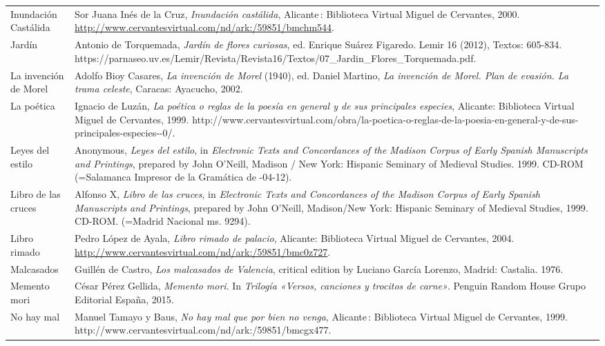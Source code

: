 \begin{tabularx}{\textwidth}{XX}
Inundación Castálida & Sor Juana Inés de la Cruz, \textit{Inundación castálida}, Alicante : Biblioteca Virtual Miguel de Cervantes, 2000. \url{http://www.cervantesvirtual.com/nd/ark:/59851/bmchm544}.\\
Jardín & Antonio de Torquemada, \textit{Jardín de flores curiosas}, ed. Enrique Suárez Figaredo. Lemir 16 (2012), Textos: 605-834. https://parnaseo.uv.es/Lemir/Revista/Revista16/Textos/07\_Jardin\_Flores\_Torquemada.pdf.\\
La invención de Morel & Adolfo Bioy Casares, \textit{La invención de Morel} (1940), ed. Daniel Martino, \textit{La invención de Morel. Plan de evasión. La trama celeste}, Caracas: Ayacucho, 2002.\\
La poética & Ignacio de Luzán, \textit{La poética o reglas de la poesía en general y de sus principales especies}, Alicante: Biblioteca Virtual Miguel de Cervantes, 1999. http://www.cervantesvirtual.com/obra/la-poetica-o-reglas-de-la-poesia-en-general-y-de-sus-principales-especies-{}-0/.\\
Leyes del estilo & Anonymous, \textit{Leyes del estilo}, in \textit{Electronic Texts and Concordances of the Madison Corpus of Early Spanish Manuscripts and Printings}, prepared by John O’Neill, Madison / New York: Hispanic Seminary of Medieval Studies. 1999. CD-ROM (=Salamanca Impresor de la Gramática de \citealt{Nebrija1500}-04-12).\\
Libro de las cruces & Alfonso X, \textit{Libro de las cruces}, in \textit{Electronic Texts and Concordances of the Madison Corpus of Early Spanish Manuscripts and Printings}, prepared by John O’Neill, Madison/New York: Hispanic Seminary of Medieval Studies, 1999. CD-ROM. (=Madrid Nacional ms. 9294).\\
Libro rimado & Pedro López de Ayala, \textit{Libro rimado de palacio}, Alicante: Biblioteca Virtual Miguel de Cervantes, 2004. \url{http://www.cervantesvirtual.com/nd/ark:/59851/bmc0z727}.\\
Malcasados & Guillén de Castro, \textit{Los malcasados de Valencia}, critical edition by Luciano García Lorenzo, Madrid: Castalia. 1976.\\
Memento mori & César Pérez Gellida, \textit{Memento mori}. In \textit{Trilogía «Versos, canciones y trocitos de carne»}. Penguin Random House Grupo Editorial España, 2015.\\
No hay mal & Manuel Tamayo y Baus, \textit{No hay mal que por bien no venga}, Alicante : Biblioteca Virtual Miguel de Cervantes, 1999. http://www.cervantesvirtual.com/nd/ark:/59851/bmcgx477.\\

\end{tabularx}
